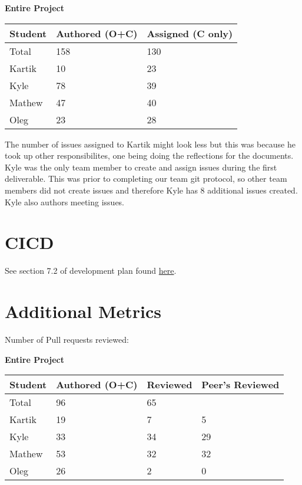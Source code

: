 \documentclass{article}
\begin{document}
\begin{table}[H]
\centering
\textbf{Entire Project}\\
\begin{tabular}{lll}
\toprule
\textbf{Student} & \textbf{Authored (O+C)} & \textbf{Assigned (C only)}\\
\midrule
Total & 158 & 130 \\
Kartik & 10 & 23\\
Kyle   & 78 & 39\\
Mathew & 47 & 40\\
Oleg   & 23 & 28\\
\bottomrule
\end{tabular}
\end{table}

The number of issues assigned to Kartik might look less but this was because he took up other responsibilites, one being doing the reflections for the documents.\\
Kyle was the only team member to create and assign issues during the first deliverable. This was prior to completing our team git protocol, so other team members did not create issues and therefore Kyle has 8 additional issues created. Kyle also authors meeting issues.
\section{CICD}

See section 7.2 of development plan found \href{https://github.com/OKKM-insights/OKKM.insights/blob/main/docs/DevelopmentPlan/DevelopmentPlan.pdf}{here}.

\section{Additional Metrics}
Number of Pull requests reviewed:

\begin{table}[H]
    \centering
    \textbf{Entire Project}\\
    \begin{tabular}{llll}
    \toprule
    \textbf{Student} & \textbf{Authored (O+C)} & \textbf{Reviewed} & \textbf{Peer's Reviewed}\\
    \midrule
    Total & 96 & 65 & \\
    Kartik & 19 & 7 & 5\\
    Kyle   & 33 & 34 & 29\\
    Mathew & 53 & 32 & 32\\
    Oleg   & 26 & 2 & 0\\
    \bottomrule
    \end{tabular}
    \end{table}
\end{document}
